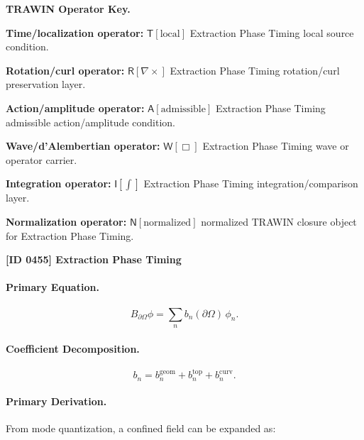 \par\vspace{0.45\baselineskip}
\noindent\begin{minipage}[t]{\linewidth}
\begingroup
\small
\raggedright
\textbf{TRAWIN Operator Key.}\par
\noindent\textbf{Time/localization operator:} $\mathsf{T}\!\left[\mathrm{local}\right]$ Extraction Phase Timing local source condition.\par
\noindent\textbf{Rotation/curl operator:} $\mathsf{R}\!\left[\nabla\times\right]$ Extraction Phase Timing rotation/curl preservation layer.\par
\noindent\textbf{Action/amplitude operator:} $\mathsf{A}\!\left[\mathrm{admissible}\right]$ Extraction Phase Timing admissible action/amplitude condition.\par
\noindent\textbf{Wave/d'Alembertian operator:} $\mathsf{W}\!\left[\Box\right]$ Extraction Phase Timing wave or operator carrier.\par
\noindent\textbf{Integration operator:} $\mathsf{I}\!\left[\int\right]$ Extraction Phase Timing integration/comparison layer.\par
\noindent\textbf{Normalization operator:} $\mathsf{N}\!\left[\mathrm{normalized}\right]$ normalized TRAWIN closure object for Extraction Phase Timing.\par
\endgroup
\end{minipage}

\clearpage
\noindent\textbf{[ID 0455] Extraction Phase Timing}\par
\vspace{0.35em}
\paragraph{Primary Equation.}
\begin{equation}
B_{\partial\Omega}\phi
=
\sum_n b_n(\partial\Omega)\,\phi_n .
\end{equation}

\paragraph{Coefficient Decomposition.}
\begin{equation}
b_n
=
b_n^{\mathrm{geom}}
+
b_n^{\mathrm{top}}
+
b_n^{\mathrm{curv}} .
\end{equation}

\paragraph{Primary Derivation.}
From mode quantization, a confined field can be expanded as:

